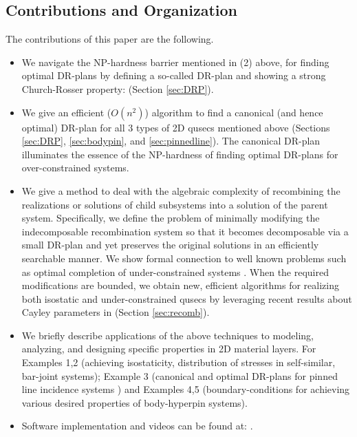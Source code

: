 \subsection{Contributions and Organization}
\label{sec:cont}

The contributions of this paper are the following.
\begin{itemize}
  \item We navigate the NP-hardness barrier mentioned in (2) above,
  for finding optimal DR-plans by defining a so-called 
  DR-plan and showing a strong Church-Rosser property:  (Section \ref{sec:DRP}).

  \item We give an efficient ($O(n^2)$) algorithm to find a canonical
  (and hence optimal) DR-plan for all 3 types of 2D qusecs mentioned
  above (Sections \ref{sec:DRP}, \ref{sec:bodypin}, and
  \ref{sec:pinnedline}). The canonical DR-plan illuminates the essence
  of the NP-hardness of finding optimal DR-plans for over-constrained
  systems.

  \item We give a method to deal with the algebraic complexity of
  recombining the realizations or solutions of child subsystems into a
  solution of the parent system. Specifically, we define the problem
  of minimally modifying the indecomposable recombination system so
  that it becomes decomposable via a small DR-plan and yet preserves
  the original solutions in an efficiently searchable manner. We show
  formal connection to well known problems such as optimal completion
  of under-constrained systems \uncited. When the required
  modifications are bounded, we obtain new, efficient algorithms for
  realizing both isostatic and under-constrained qusecs by leveraging
  recent results about Cayley parameters in \uncited\uncited (Section
  \ref{sec:recomb}).

  \item We briefly describe applications of the above techniques to
  modeling, analyzing, and designing specific properties in 2D material
  layers. For Examples 1,2 (achieving isostaticity, distribution of
  stresses in self-similar, bar-joint systems); Example 3 (canonical
  and optimal DR-plans for pinned line incidence systems \uncited)
  and Examples 4,5 (boundary-conditions for achieving various desired
  properties of body-hyperpin systems).

  \item Software implementation and videos can be found at:
  .
\end{itemize}
